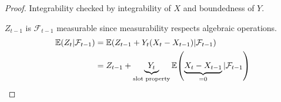 \begin{proof}
  Integrability checked by integrability of $X$ and boundedness of
  $Y$.

  $Z_{t-1}$ is $\mathcal{F}_{t-1}$ measurable since measurability
  respects algebraic operations.
  \begin{align*}
    \E{Z_{t} | \mathcal{F}_{t-1}} & = \E{Z_{t-1} + Y_{t}(X_{t} -
      X_{t-1}) | \mathcal{F}_{t-1}} \\
                                  & = Z_{t-1} + \underbrace{Y_{t}}_{\text{slot property}} \E{\underbrace{X_{t} - X_{t-1}}_{=0} | \mathcal{F}_{t-1}}
  \end{align*}

\end{proof}
